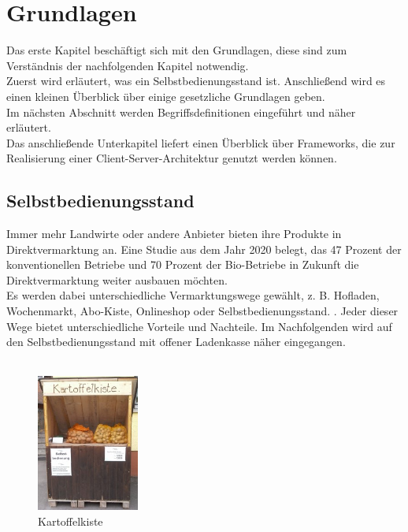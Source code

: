\section{Grundlagen}\label{grundlagen}
Das erste Kapitel beschäftigt sich mit den Grundlagen, diese sind zum Verständnis der nachfolgenden Kapitel notwendig.
\\
Zuerst wird erläutert, was ein Selbstbedienungsstand ist.
Anschließend wird es einen kleinen Überblick über einige gesetzliche Grundlagen geben.
\\
Im nächsten Abschnitt werden Begriffsdefinitionen eingeführt und näher erläutert.
\\
Das anschließende Unterkapitel liefert einen Überblick über Frameworks, die zur Realisierung einer Client-Server-Architektur genutzt werden können.


\subsection{Selbstbedienungsstand}\label{selbstbedienungsstand mit offener Ladenkasse}

Immer mehr Landwirte oder andere Anbieter bieten ihre Produkte in Direktvermarktung an.
Eine Studie \cite{direkt2} aus dem Jahr 2020 belegt, das 47 Prozent der konventionellen Betriebe und 70 Prozent der Bio-Betriebe in Zukunft die Direktvermarktung weiter ausbauen möchten.
\\
Es werden dabei unterschiedliche Vermarktungswege gewählt, z. B. Hofladen, Wochenmarkt, Abo-Kiste, Onlineshop oder Selbstbedienungsstand. \cite{Regional}. Jeder dieser Wege bietet unterschiedliche Vorteile und Nachteile. Im Nachfolgenden wird auf den Selbstbedienungsstand mit offener Ladenkasse näher eingegangen.
\\
\\
\begin{figure}[hh]
	\centering
	\includegraphics[width=0.3\textwidth,angle=0]{abb/Kartoffelkiste}
	\caption[Die Kartoffelkiste]{\glqq Kartoffelkiste\grqq{} \cite{Kartoffelkiste}}
	\label{fig:Kartoffelkiste}
\end{figure}



